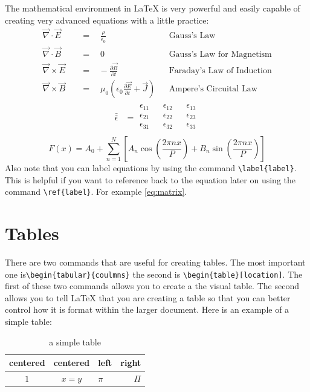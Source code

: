 \documentclass{article} 	%
\numberwithin{equation}{section}
\newcommand{\tensor}[1]{\bar{\bar{#1}}}		%
\begin{document}
		The mathematical environment in \LaTeX{} is very powerful and easily capable of creating very advanced equations with a little practice:
		\begin{align} 				%
		\vec{\nabla} \cdot \vec{E} \quad &=\quad\frac{\rho}{\epsilon_{0}} &&\text{Gauss's Law} \label{eq:GL}\\  	%
		\vec{\nabla} \cdot \vec{B} \quad &=\quad 0 &&\text{Gauss's Law for Magnetism} \label{eq:GLM}\\
		\vec{\nabla} \times \vec{E} \quad &=\hspace{10pt}-\frac{\partial{\vec{B}}}{\partial{t}} &&\text{Faraday's Law of Induction} \label{eq:FL}\\
		\vec{\nabla} \times \vec{B} \quad &=\quad \mu_0 \left( \epsilon_0\frac{\partial{\vec{E}}}{\partial{t}}+\vec{J} \right) &&\text{Ampere's Circuital Law} \label{eq:AL}
		\end{align}
		\begin{align}
		\tensor{\epsilon} &= \begin{matrix} %
			\epsilon_{11} && \epsilon_{12} &&\epsilon_{13} \\
			\epsilon_{21} && \epsilon_{22} &&\epsilon_{23} \\
			\epsilon_{31} && \epsilon_{32} &&\epsilon_{33} \\
		\end{matrix}
		\label{eq:matrix}  %
		\end{align}
		\begin{equation}
		F(x)= A_0 + \sum_{n=1}^N\left[ A_n\cos{\left(\frac{2\pi nx}{P}\right)}+B_n\sin{\left(\frac{2\pi nx}{P}\right)}\right]
		\end{equation}
		Also note that you can label equations by using the command \verb|\label{label}|.  This is helpful if you want to reference back to the equation later on using the command \verb|\ref{label}|.  For example \ref{eq:matrix}.
	\section{Tables}
	There are two commands that are useful for creating tables.  The most important one is\verb|\begin{tabular}{coulmns}| the second is \verb|\begin{table}[location]|.  The first of these two commands allows you to create a the visual table.  The second allows you to tell \LaTeX{} that you are creating a table so that you can better control how it is format within the larger document.  Here is an example of a simple table:
	\begin{table}[h]
		\caption{a simple table}
		\centering
		\begin{tabular}{|cc|l|r|}
			\hline
			centered & centered & left & right \\
			\hline
			$1$ & $x=y$&$\pi$&$\Pi$\\
			\hline
		\end{tabular}
	\end{table}
\end{document}
